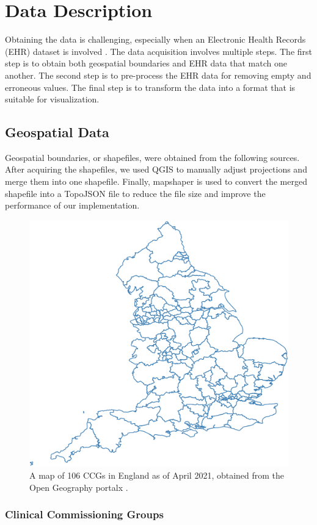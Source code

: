 \section{Data Description}

Obtaining the data is challenging, especially when an Electronic Health Records (EHR) dataset is involved \cite{wang2021EHRa}. The data acquisition involves multiple steps. The first step is to obtain both geospatial boundaries and EHR data that match one another. The second step is to pre-process the EHR data for removing empty and erroneous values. The final step is to transform the data into a format that is suitable for visualization.

\subsection{Geospatial Data}

Geospatial boundaries, or shapefiles, were obtained from the following sources. After acquiring the shapefiles, we used QGIS \cite{qgisWelcome} to manually adjust projections and merge them into one shapefile. Finally, mapshaper \cite{blochMapshaper} is used to convert the merged shapefile into a TopoJSON \cite{TopoJSON} file to reduce the file size and improve the performance of our implementation.

{
\begin{figure}[tb!]
    \centering
    \includegraphics[width=0.6\columnwidth]{figure/ccg.png}
    \caption{A map of 106 CCGs in England as of April 2021, obtained from the Open Geography portalx \cite{opengeographyportalxOpen}.}
    \label{fig:ccg}
\end{figure}
}

\subsubsection{Clinical Commissioning Groups}


